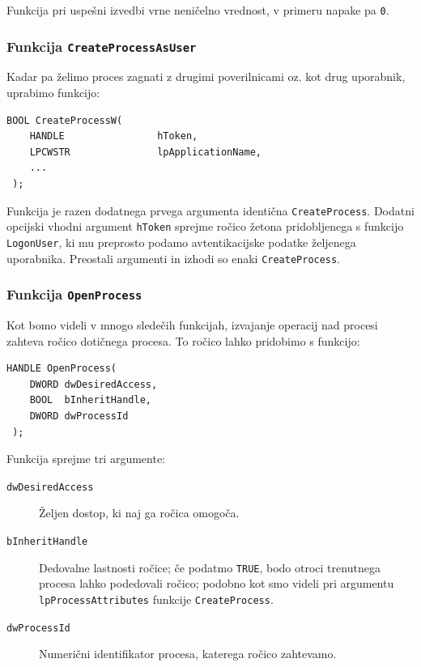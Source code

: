 \documentclass[a4paper,12pt,openright]{book}
\begin{document}
Funkcija pri uspešni izvedbi vrne neničelno vrednost, v primeru napake pa \texttt{0}.

\subsubsection{Funkcija \texttt{CreateProcessAsUser}}

Kadar pa želimo proces zagnati z drugimi poverilnicami oz. kot drug uporabnik, uprabimo funkcijo:
\begin{lstlisting}[style=func]
 BOOL CreateProcessW(
	HANDLE                hToken,   
	LPCWSTR               lpApplicationName,
	...
 );
\end{lstlisting}

Funkcija je razen dodatnega prvega argumenta identična \texttt{CreateProcess}.
Dodatni opcijski vhodni argument \texttt{hToken} sprejme ročico žetona pridobljenega s funkcijo \texttt{LogonUser}, ki mu preprosto podamo avtentikacijske podatke željenega uporabnika.
Preostali argumenti in izhodi so enaki \texttt{Create\-Process}.

\subsubsection{Funkcija \texttt{OpenProcess}}

Kot bomo videli v mnogo sledečih funkcijah, izvajanje operacij nad procesi zahteva ročico dotičnega procesa.
To ročico lahko pridobimo s funkcijo:
\begin{lstlisting}[style=func]
 HANDLE OpenProcess(
	DWORD dwDesiredAccess,
	BOOL  bInheritHandle,
	DWORD dwProcessId
 );
\end{lstlisting}

Funkcija sprejme tri argumente:
\begin{description}
	\item[\texttt{dwDesiredAccess}] Željen dostop, ki naj ga ročica omogoča.
	\item[\texttt{bInheritHandle}] Dedovalne lastnosti ročice; če podatmo \texttt{TRUE}, bodo otroci trenutnega procesa lahko podedovali ročico; podobno kot smo videli pri argumentu \texttt{lpProcessAttributes} funkcije \texttt{CreateProcess}.
	\item[\texttt{dwProcessId}] Numerični identifikator procesa, katerega ročico zahtevamo.
\end{description}
\end{document}
